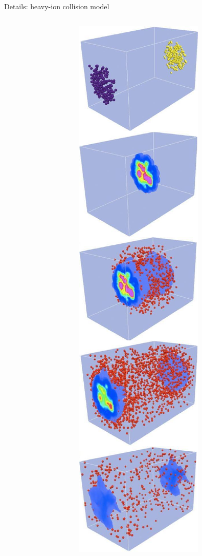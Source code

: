 \documentclass{beamer}
\begin{document}
\begin{frame}{Details: heavy-ion collision model}
  \smallskip
  \begin{columns}[T]
      \begin{column}{.075\textwidth}
      \end{column}
      \begin{column}{.2\textwidth}
        \centering \medskip
        \includegraphics[height=.75\textheight]{evolution} \\[1ex]

\end{column}
\end{columns}
\end{frame}
\end{document}
